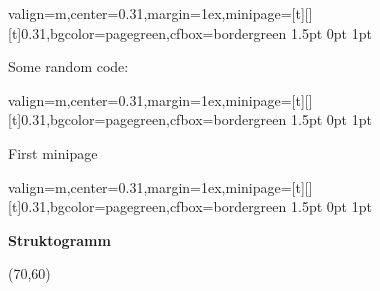 \documentclass[11pt, a4paper, landscape]{article}
\newcommand{\fancyheader}[1]{
	\centerline{\sffamily \textbf{ \large #1}}
}
\newenvironment{fancybox}[2]
{
	\begin{adjustbox}{valign=m,center=0.31\textwidth,margin=1ex,minipage=[t][][t]{0.31\textwidth},bgcolor=#1,cfbox=#2 1.5pt 0pt 1pt}
	\begin{centering}
}
{
	\end{centering}
	\end{adjustbox}
}
\begin{document}
\begin{multicols}{3}
\begin{fancybox}{pagegreen}{bordergreen}
Some random code:

\end{fancybox}

\begin{fancybox}{pagegreen}{bordergreen}
	First minipage
\end{fancybox}

\begin{fancybox}{pagegreen}{bordergreen}
\fancyheader{Struktogramm}

\begin{struktogramm}(70,60)
			\change
		\ifend
		\change
	\ifend
\end{struktogramm}

\end{fancybox}


\end{multicols}
\end{document}
